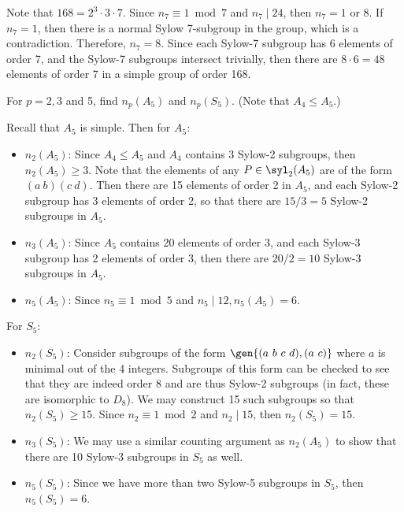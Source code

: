 \begin{sol}
	Note that $168 = 2^3 \cdot 3 \cdot 7$. Since $n_7 \equiv 1 \bmod 7$ and $n_7 \mid 24$, then $n_7 = 1$ or $8$. If $n_7 = 1$, then there is a normal Sylow 7-subgroup in the group, which is a contradiction. Therefore, $n_7 = 8$. Since each Sylow-7 subgroup has 6 elements of order 7, and the Sylow-7 subgroups intersect trivially, then there are $8 \cdot 6 = 48$ elements of order 7 in a simple group of order 168.
\end{sol}

\begin{exercise}\label{ex4.5.31}
	For $p = 2, 3$ and 5, find $n_p(A_5)$ and $n_p(S_5)$. (Note that $A_4 \leq A_5$.)
\end{exercise}

\begin{sol}
	Recall that $A_5$ is simple. Then for $A_5$:
	\begin{itemize}
		\item $n_2(A_5)$: Since $A_4 \leq A_5$ and $A_4$ contains 3 Sylow-2 subgroups, then $n_2(A_5) \geq 3$. Note that the elements of any $P \in \syl_2(A_5)$ are of the form $(a\ b)(c\ d)$. Then there are 15 elements of order 2 in $A_5$, and each Sylow-2 subgroup has 3 elements of order 2, so that there are $15/3 = 5$ Sylow-2 subgroups in $A_5$.
		\item $n_3(A_5)$: Since $A_5$ contains 20 elements of order 3, and each Sylow-3 subgroup has 2 elements of order 3, then there are $20/2 = 10$ Sylow-3 subgroups in $A_5$.
		\item $n_5(A_5)$: Since $n_5 \equiv 1 \bmod 5$ and $n_5 \mid 12, n_5(A_5) = 6$.
	\end{itemize}
	For $S_5$:
	\begin{itemize}
		\item $n_2(S_5)$: Consider subgroups of the form $\gen{(a\ b\ c\ d), (a\ c)}$ where $a$ is minimal out of the 4 integers. Subgroups of this form can be checked to see that they are indeed order 8 and are thus Sylow-2 subgroups (in fact, these are isomorphic to $D_8$). We may construct 15 such subgroups so that $n_2(S_5) \geq 15$. Since $n_2 \equiv 1 \bmod 2$ and $n_2 \mid 15$, then $n_2(S_5) = 15$.
		\item $n_3(S_5)$: We may use a similar counting argument as $n_2(A_5)$ to show that there are 10 Sylow-3 subgroups in $S_5$ as well.
		\item $n_5(S_5)$: Since we have more than two Sylow-5 subgroups in $S_5$, then $n_5(S_5) = 6$.
	\end{itemize}	
\end{sol}

